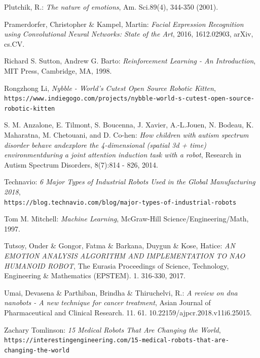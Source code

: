 \documentclass[runningheads,a4paper,12pt]{report}
\begin{document}
\begin{thebibliography}{9}
Plutchik, R.: 
\textit{The nature of emotions}, 
Am. Sci.89(4), 344-350 (2001).

Pramerdorfer, Christopher \& Kampel, Martin:
\textit{Facial Expression Recognition using Convolutional Neural Networks: State of the Art}, 2016, 1612.02903, arXiv, cs.CV. 

 Richard S. Sutton, Andrew G. Barto:
\textit{Reinforcement Learning - An Introduction},
MIT Press,
Cambridge, MA,
1998.

Rongzhong Li,
\textit{Nybble - World's Cutest Open Source Robotic Kitten},
\texttt{https://www.indiegogo.com/projects/nybble-world-s-cutest-open-source-robotic-kitten}

S. M. Anzalone, E. Tilmont, S. Boucenna, J. Xavier, A.-L.Jouen, N. Bodeau, K. Maharatna, M. Chetouani, and D. Co-hen:
\textit{How children with autism spectrum disorder behave andexplore the 4-dimensional (spatial 3d + time) environmentduring a joint attention induction task with a robot},
Research in Autism Spectrum Disorders, 8(7):814 - 826, 2014.

Technavio:
\textit{6 Major Types of Industrial Robots Used in the Global Manufacturing 2018}, 
\\\texttt{https://blog.technavio.com/blog/major-types-of-industrial-robots}

Tom M. Mitchell: 
\textit{Machine Learning},
McGraw-Hill Science/Engineering/Math,
1997.

Tutsoy, Onder \& Gongor, Fatma \& Barkana, Duygun \& Kose, Hatice:
\textit{AN EMOTION ANALYSIS ALGORITHM AND IMPLEMENTATION TO NAO HUMANOID ROBOT}, 
The Eurasia Proceedings of Science, Technology, Engineering \& Mathematics (EPSTEM). 1. 316-330, 2017. 

Umai, Devasena \& Parthiban, Brindha \& Thiruchelvi, R.:
\textit{A review on dna nanobots - A new technique for cancer treatment},
Asian Journal of Pharmaceutical and Clinical Research. 11. 61. 10.22159/ajpcr.2018.v11i6.25015. 

Zachary Tomlinson:
\textit{15 Medical Robots That Are Changing the World},
\texttt{https://interestingengineering.com/15-medical-robots-that-are-changing-the-world}

\end{thebibliography}
\end{document}
